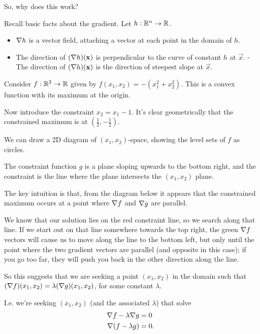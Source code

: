 So, why does this work?

Recall basic facts about the gradient. Let $h:\mathbb{R}^n \to \mathbb{R}$.
\begin{itemize}
\item $\nabla h$ is a vector field, attaching a vector at each point in the domain of $h$.
\item The direction of $(\nabla h)(\mathbf x)$ is perpendicular to the curve of constant $h$ at $\vec x$.
- The direction of $(\nabla h)(\mathbf x)$ is the direction of steepest slope at $\vec x$.
\end{itemize}

\begin{intuition}
  Consider $f:\mathbb{R}^2 \to \mathbb{R}$ given by $f(x_1, x_2) = -(x_1^2 + x_2^2)$. This is a convex function with its
  maximum at the origin.

  Now introduce the constraint $x_2 = x_1 - 1$. It's clear geometrically that the constrained maximum
  is at $(\frac{1}{2}, -\frac{1}{2})$.

  We can draw a 2D diagram of $(x_1, x_2)$-space, showing the level sets of $f$ as circles.

  The constraint function $g$ is a plane sloping upwards to the bottom right, and the constraint is
  the line where the plane intersects the $(x_1,x_2)$ plane.

  The key intuition is that, from the diagram below it appears that the constrained maximum occurs
  at a point where $\nabla f$ and $\nabla g$ are parallel.

  We know that our solution lies on the red constraint line, so we search along that line. If we
  start out on that line somewhere towards the top right, the green $\nabla f$ vectors will cause us to
  move along the line to the bottom left, but only until the point where the two gradient vectors are
  parallel (and opposite in this case); if you go too far, they will push you back in the other
  direction along the line.

  So this suggests that we are seeking a point $(x_1, x_2)$ in the domain such that
  $(\nabla f)(x_1, x_2) = \lambda (\nabla g)(x_1, x_2)$, for some constant $\lambda$.

  I.e. we're seeking $(x_1, x_2)$ (and the associated $\lambda$) that solve
\begin{align*}
  \nabla f - \lambda \nabla g &= 0 \\
  \nabla (f - \lambda g) &= 0.
\end{align*}


\end{intuition}
